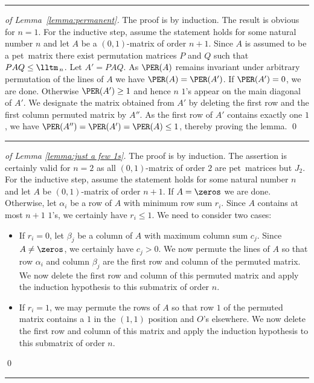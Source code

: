 \documentclass[a4paper,10pt]{llncs}
\newcommand{\PET}{pet}
\newcommand{\horiz}{{\centering\rule{350pt}{.4pt}}}
\begin{document}
\horiz

\begin{proof}[of Lemma~\ref{lemma:permanent}]
The proof is by induction.
The result is obvious for $n=1$.
For the inductive step, assume the statement holds for some natural number $n$
and let $A$ be a $(0,1)$-matrix of order $n+1$.
Since $A$ is assumed to be a \PET\
matrix there exist permutation matrices $P$ and $Q$ such that
$PAQ \leq \lltm_{\,n}$.
Let $A' = PAQ$.
As $\PER(A)$ remains invariant under arbitrary permutation of the lines of $A$
we have $\PER(A) = \PER(A')$.
If $\PER(A') = 0$, we are done.
Otherwise $\PER(A') \geq 1$ and hence
$n$ $1$'s appear on the main diagonal of $A'$.
We designate the matrix obtained from $A'$ by deleting
the first row and the first column permuted matrix by $A''$.
As the first row of $A'$ contains exactly one $1$,
we have $\PER(A'') = \PER(A') = \PER(A) \leq 1$, thereby proving the lemma.
\qed
\end{proof}

\horiz

\begin{proof}[of Lemma \ref{lemma:just a few 1s}]
The proof is by induction.
The assertion is certainly valid for $n = 2$ as
all $(0,1)$-matrix of order $2$ are \PET\ matrices but $J_2$.
For the inductive step, assume the statement holds for some natural number $n$ and let
$A$ be $(0,1)$-matrix of order $n+1$.
If $A = \zeros$ we are done.
Otherwise, let $\alpha_i$ be a row of $A$ with minimum row sum $r_i$.
Since $A$ contains at most $n+1$ $1$'s, we certainly have $r_i \leq 1$.
We need to consider two cases:
\begin{itemize}
\item
If $r_i = 0$,
let $\beta_j$ be a column of $A$ with maximum column sum $c_j$.
Since $A \neq \zeros$, we certainly have $c_j > 0$.
We now permute the lines of $A$ so that row $\alpha_i$ and
column $\beta_j$ are the first row and column of the permuted matrix.
We now delete the first row and column of this permuted matrix and
apply the induction hypothesis to this submatrix of order $n$.
\item
If $r_i = 1$,
we may permute the rows of $A$ so that row $1$ of the permuted matrix
contains a $1$ in the $(1,1)$ position and $O$'s elsewhere.
We now delete the first row and column of this matrix and apply the induction
hypothesis to this submatrix of order $n$.
\end{itemize}
\qed
\end{proof}

\horiz
\end{document}
